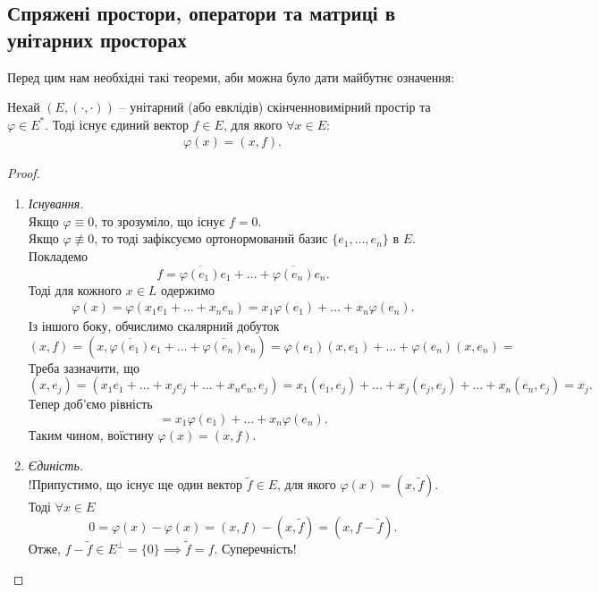 \documentclass{math_library}
\begin{document}
\subsection{Спряжені простори, оператори та матриці в унітарних просторах}
Перед цим нам необхідні такі теореми, аби можна було дати майбутнє означення:
\begin{theorem}
Нехай $(E,(\cdot,\cdot))$ -- унітарний (або евклідів) скінченновимірний простір та $\varphi \in E^*$. Тоді існує єдиний вектор $f \in E$, для якого $\forall x \in E:$
\begin{align*}
\varphi(x) = (x,f).
\end{align*}
\end{theorem}

\begin{proof}
\begin{enumerate}[topsep=0pt,wide=0pt,label={\Roman*.}]
\item \textit{Існування.}\\
Якщо $\varphi \equiv 0$, то зрозуміло, що існує $f = 0$.\\
Якщо $\varphi \not\equiv 0$, то тоді зафіксуємо ортонормований базис $\{e_1,\dots,e_n\}$ в $E$. Покладемо 
\[
f = \overline{\varphi(e_1)}e_1 + \dots + \overline{\varphi(e_n)}e_n.
\]
Тоді для кожного $x \in L$ одержимо
\begin{align*}
\varphi(x) = \varphi(x_1 e_1+\dots+x_n e_n) = x_1 \varphi(e_1) + \dots + x_n \varphi(e_n).
\end{align*}
Із іншого боку, обчислимо скалярний добуток
\[
(x,f) = (x,\overline{\varphi(e_1)}e_1 + \dots + \overline{\varphi(e_n)}e_n) = \varphi(e_1) (x,e_1) + \dots + \varphi(e_n)(x,e_n) \boxed{=}
\]
Треба зазначити, що
\[
(x,e_j) = (x_1 e_1 + \dots + x_j e_j + \dots + x_n e_n, e_j) = x_1 (e_1,e_j) + \dots + x_j (e_j,e_j) + \dots + x_n (e_n,e_j) = x_j.
\]
Тепер доб'ємо рівність
\[
\boxed{=} x_1 \varphi(e_1) + \dots + x_n \varphi(e_n).
\]
Таким чином, воїстину $\varphi(x) = (x,f)$.

\item \textit{Єдиність.}\\
!Припустимо, що існує ще один вектор $\widetilde{f} \in E$, для якого $\varphi(x) = (x,\widetilde{f})$. Тоді $\forall x \in E$
\[
0 = \varphi(x) - \varphi(x) = (x,f) - (x,\widetilde{f}) = (x,f-\widetilde{f}).
\]
Отже, $f-\widetilde{f} \in E^\perp = \{0\} \implies \widetilde{f} = f$. Суперечність! \qedhere
\end{enumerate}
\end{proof}
\end{document}
